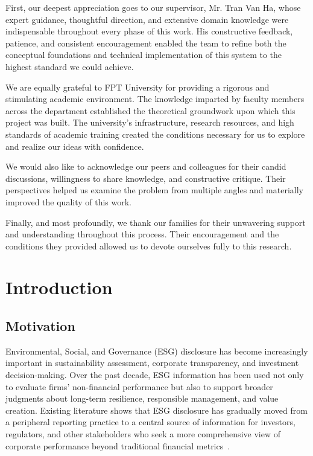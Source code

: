 \documentclass[sn-mathphys, oneside]{sn-jnl}
\begin{document}
First, our deepest appreciation goes to our supervisor, Mr. Tran Van Ha, whose expert guidance, thoughtful direction, and extensive domain knowledge were indispensable throughout every phase of this work. His constructive feedback, patience, and consistent encouragement enabled the team to refine both the conceptual foundations and technical implementation of this system to the highest standard we could achieve.

We are equally grateful to FPT University for providing a rigorous and stimulating academic environment. The knowledge imparted by faculty members across the department established the theoretical groundwork upon which this project was built. The university's infrastructure, research resources, and high standards of academic training created the conditions necessary for us to explore and realize our ideas with confidence.

We would also like to acknowledge our peers and colleagues for their candid discussions, willingness to share knowledge, and constructive critique. Their perspectives helped us examine the problem from multiple angles and materially improved the quality of this work.

Finally, and most profoundly, we thank our families for their unwavering support and understanding throughout this process. Their encouragement and the conditions they provided allowed us to devote ourselves fully to this research.
\newpage
\tableofcontents
\newpage
\listoffigures
\newpage
\section{Introduction}

\subsection{Motivation}

Environmental, Social, and Governance (ESG) disclosure has become increasingly important in sustainability assessment, corporate transparency, and investment decision-making. Over the past decade, ESG information has been used not only to evaluate firms’ non-financial performance but also to support broader judgments about long-term resilience, responsible management, and value creation. Existing literature shows that ESG disclosure has gradually moved from a peripheral reporting practice to a central source of information for investors, regulators, and other stakeholders who seek a more comprehensive view of corporate performance beyond traditional financial metrics~\cite{tsang2023,ref_article1}.
\end{document}
